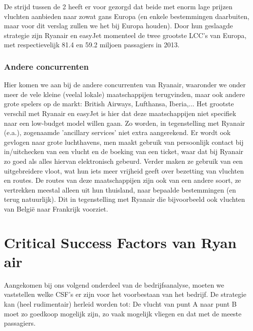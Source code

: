 \documentclass{article}
\begin{document}
De strijd tussen de 2 heeft er voor gezorgd dat beide met enorm lage prijzen vluchten aanbieden naar zowat gans Europa (en enkele bestemmingen daarbuiten, maar voor dit verslag zullen we het bij Europa houden). Door hun geslaagde strategie zijn Ryanair en easyJet momenteel de twee grootste LCC's van Europa, met respectievelijk 81.4 en 59.2 miljoen passagiers in 2013.

\section{Andere concurrenten}

Hier komen we aan bij de andere concurrenten van Ryanair, waaronder we onder meer de vele kleine (veelal lokale) maatschappijen terugvinden, maar ook andere grote spelers op de markt: British Airways, Lufthansa, Iberia,... 
Het grootste verschil met Ryanair en easyJet is hier dat deze maatschappijen niet specifiek naar een low-budget model willen gaan. Zo worden, in tegenstelling met Ryanair (e.a.), zogenaamde 'ancillary services' niet extra aangerekend. Er wordt ook gevlogen naar grote luchthavens, men maakt gebruik van persoonlijk contact bij in/uitchecken van een vlucht en de boeking van een ticket, waar dat bij Ryanair zo goed als alles hiervan elektronisch gebeurd. Verder maken ze gebruik van een uitgebreidere vloot, wat hun iets meer vrijheid geeft over bezetting van vluchten en routes.
De routes van deze maatschappijen zijn ook van een andere soort, ze vertrekken meestal alleen uit hun thuisland, naar bepaalde bestemmingen (en terug natuurlijk). Dit in tegenstelling met Ryanair die bijvoorbeeld ook vluchten van Belgi\"e naar Frankrijk voorziet.

\part{Critical Success Factors van Ryan air}

Aangekomen bij ons volgend onderdeel van de bedrijfsanalyse, moeten we vaststellen welke CSF's er zijn voor het voorbestaan van het bedrijf. De strategie kan (heel rudimentair) herleid worden tot: De vlucht van punt A naar punt B moet zo goedkoop mogelijk zijn, zo vaak mogelijk vliegen en dat met de meeste passagiers.
\end{document}
